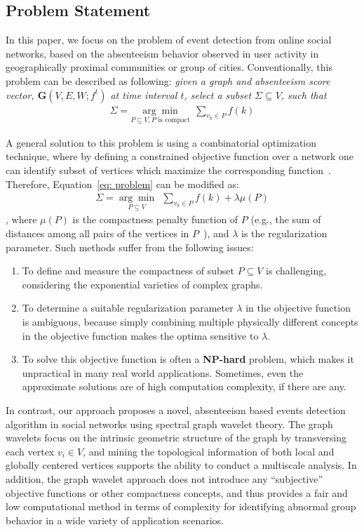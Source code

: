 \subsection{Problem Statement}
\label{sec:problemformulation}
In this paper, we focus on the problem of event detection from online social networks, based on the absenteeism behavior observed in user activity in geographically proximal communities or group of cities.
Conventionally, this problem can be described as following: \emph{given a graph and \textit{absenteeism score} vector, $\mathbf{G}(V,E,W;f^t)$ at time interval $t$, select a subset $\Sigma \subseteq V$, such that
\begin{eqnarray}
 \label{eq: problem}
    \Sigma=\underset{P\subseteq V, P \mbox{ is compact}}{\arg\min}\ \ \sum_{v_k\in P} {f(k)}
\end{eqnarray} }

A general solution to this problem is using a combinatorial optimization technique, where by defining a constrained objective function over a network one can identify subset of vertices which maximize the corresponding function~\cite{rozenshtein2014event}. Therefore, Equation~\ref{eq: problem} can be modified as:
\begin{eqnarray}
 \label{eq: problem_conventional}
    \Sigma=\underset{P\subseteq V}{\arg\min}\ \ \sum_{v_k\in P} {f(k)}+\lambda \mu(P)
\end{eqnarray}
, where $\mu(P)$ is the compactness penalty function of $P$ (e.g., the sum of distances among
all pairs of the vertices in $P$~\cite{rozenshtein2014event}), and $\lambda$ is the regularization parameter.
Such methods suffer from the following issues:
\vspace{-1.5mm}
\begin{enumerate}
\item To define and measure the compactness of subset $P\subseteq V$ is challenging, considering the exponential varieties of complex graphs.
\item To determine a suitable regularization parameter $\lambda$ in the objective function is ambiguous, because simply combining multiple physically different concepts in the objective function makes the optima sensitive to $\lambda$.
\item To solve this objective function is often a \textbf{NP-hard} problem, which makes it unpractical in many real world applications. Sometimes, even the approximate solutions are of high computation complexity, if there are any.
\end{enumerate}
\vspace{-1.5mm}
In contrast, our approach proposes a novel, absenteeism based events detection algorithm in social networks using spectral graph wavelet theory.
The graph wavelets focus on the intrinsic geometric structure of the graph by transversing each vertex $v_i\in V$, and mining the topological information of both local and globally centered vertices supports the ability to conduct a multiscale analysis.
In addition, the graph wavelet approach does not introduce any ``subjective'' objective functions or other compactness concepts, and thus provides a fair and low computational method in terms of complexity for identifying abnormal group behavior in a wide variety of application scenarios.


